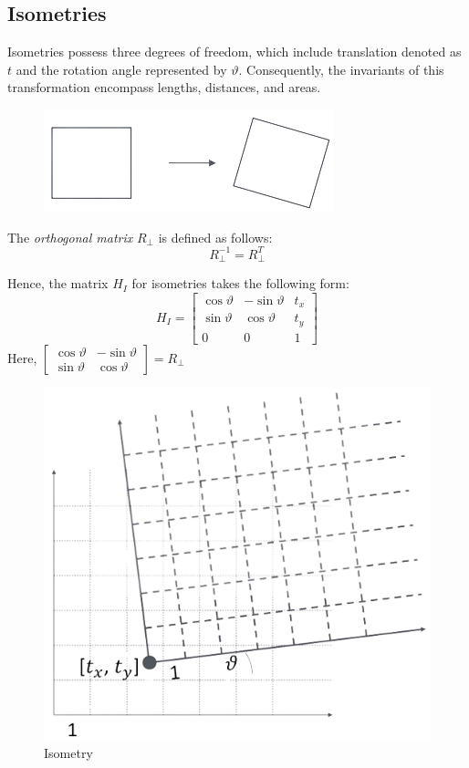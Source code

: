 \subsection*{Isometries}
Isometries possess three degrees of freedom, which include translation denoted as $t$ and the rotation angle represented by $\vartheta$. 
Consequently, the invariants of this transformation encompass lengths, distances, and areas.
\begin{figure}[H]
    \centering
    \includegraphics[width=0.25\linewidth]{images/isometry.png}
\end{figure}
\begin{definition}
    The \emph{orthogonal matrix} $R_{\perp}$ is defined as follows: 
    \[R_{\perp}^{-1}=R_{\perp}^{T}\]
\end{definition}
Hence, the matrix $H_I$ for isometries takes the following form:
\[H_I=
\begin{bmatrix}
    \cos \vartheta & -\sin \vartheta & t_x \\
    \sin \vartheta & \cos \vartheta & t_y \\
    0 & 0 & 1
\end{bmatrix}\]
Here, $
\begin{bmatrix}
    \cos \vartheta & -\sin \vartheta \\
    \sin \vartheta & \cos \vartheta
\end{bmatrix}
=R_{\perp}$
\begin{figure}[H]
    \centering
    \includegraphics[width=0.25\linewidth]{images/isometry1.png}
    \caption{Isometry}
\end{figure}

